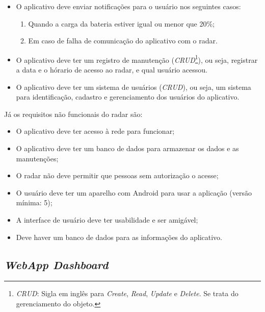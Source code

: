 \begin{itemize}
    \item O aplicativo deve enviar notificações para o usuário nos seguintes casos:
    \begin{enumerate}
        \item Quando a carga da bateria estiver igual ou menor que 20\%;
        \item Em caso de falha de comunicação do aplicativo com o radar.
    \end{enumerate}
\end{itemize}


\begin{itemize}
     \item O aplicativo deve ter um registro de manutenção (\textit{CRUD}\footnote{\textit{CRUD}: Sigla em inglês para \textit{Create}, \textit{Read}, \textit{Update} e \textit{Delete}. Se trata do gerenciamento do objeto.}), ou seja, registrar a data e o hórario de acesso ao radar, e qual usuário acessou.
\end{itemize}

\begin{itemize}
     \item O aplicativo deve ter um sistema de usuários (\textit{CRUD}), ou seja, um sistema para identificação, cadastro e gerenciamento dos usuários do aplicativo.
\end{itemize}

Já os requisitos não funcionais do radar são:

\begin{itemize}
    \item O aplicativo deve ter acesso à rede para funcionar;
    \item O aplicativo deve ter um banco de dados para armazenar os dados e as manutenções;
    \item O radar não deve permitir que pessoas sem autorização o acesse;
    \item O usuário deve ter um aparelho com Android para usar a aplicação (versão mínima: 5);
    \item A interface de usuário deve ter usabilidade e ser amigável;
    \item Deve haver um banco de dados para as informações do aplicativo.
\end{itemize}

\subsection{\textit{WebApp Dashboard}}

